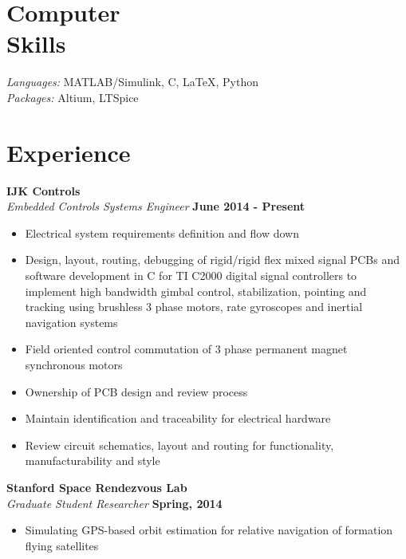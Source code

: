 \documentclass[margin,line]{resume}
\begin{document}
\begin{resume}
    \section{\mysidestyle Computer\\ Skills}

    \textsl{Languages:} MATLAB/Simulink, C, \LaTeX , Python\\
    \textsl{Packages:} Altium, LTSpice%


    \section{\mysidestyle Experience}

    \textbf{IJK Controls}\\
    \textsl{Embedded Controls Systems Engineer} \hfill \textbf{June 2014 - Present}\\ \vspace{-4mm}
    \begin{itemize} \itemsep -2pt
       \item Electrical system requirements definition and flow down
        \item Design, layout, routing, debugging of rigid/rigid flex mixed signal PCBs and software development in C for TI C2000 digital signal controllers to implement high bandwidth gimbal control, stabilization, pointing and tracking using brushless 3 phase motors, rate gyroscopes and inertial navigation systems
        \item Field oriented control commutation of 3 phase permanent magnet synchronous motors
        \item Ownership of PCB design and review process
        \item Maintain identification and traceability for electrical hardware
        \item Review circuit schematics, layout and routing for functionality, manufacturability and style
    \end{itemize} \vspace{-2.25mm}

    \textbf{Stanford Space Rendezvous Lab}\\
    \textsl{Graduate Student Researcher} \hfill \textbf{Spring, 2014}\\ \vspace{-4mm}
    \begin{itemize} \itemsep -2pt
        \item Simulating GPS-based orbit estimation for relative navigation of formation flying satellites
    \end{itemize} \vspace{-2.25mm}


\end{resume}
\end{document}
